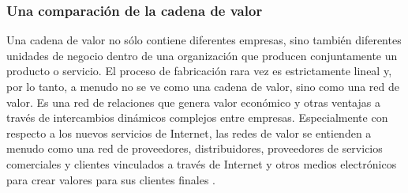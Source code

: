 \documentclass[a4paper, 12pt]{report}
\begin{document}
\subsubsection{Una comparación de la cadena de valor}
\begin{justify}
Una cadena de valor no sólo contiene diferentes empresas, sino también diferentes unidades de negocio dentro de una organización que producen conjuntamente un producto o servicio. El proceso de fabricación rara vez es estrictamente lineal y, por lo tanto, a menudo no se ve como una cadena de valor, sino como una red de valor. Es una red de relaciones que genera valor económico y otras ventajas a través de intercambios dinámicos complejos entre empresas. Especialmente con respecto a los nuevos servicios de Internet, las redes de valor se entienden a menudo como una red de proveedores, distribuidores, proveedores de servicios comerciales y clientes vinculados a través de Internet y otros medios electrónicos para crear valores para sus clientes finales \cite{Tapscott}.
\end{justify}
\end{document}
